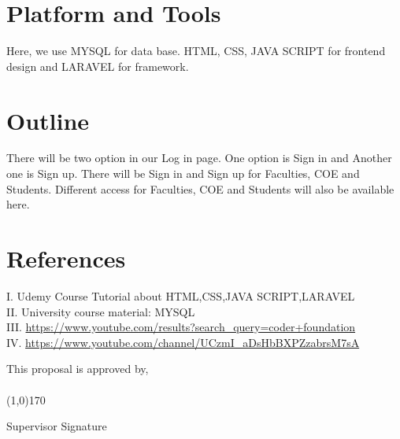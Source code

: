 \documentclass{article}
\begin{document}
\begin{titlepage}
\begin{figure}[h!]
\end{figure}

\vspace{10cm}

\section{Platform and Tools}\label{oject}

Here, we use MYSQL for data base. HTML, CSS, JAVA SCRIPT for frontend design and LARAVEL for framework.


\section{Outline}\label{oject}

There will be two option in our Log in page. One option is Sign in and Another one is Sign up. There will be Sign in and Sign up for Faculties, COE and Students. Different access for Faculties, COE and Students will also be available here.

\section{References}\label{oject}
I.	Udemy Course Tutorial about HTML,CSS,JAVA SCRIPT,LARAVEL \\
II.	University course material: MYSQL \\
III. \url{https://www.youtube.com/results?search_query=coder+foundation} \\
IV. \url{https://www.youtube.com/channel/UCzmI_aDsHbBXPZzabrsM7sA}

\vspace{10cm}
\label{oject}
This proposal is approved by,\\ \\


\hspace{300pt} \line(1,0){170}	

\hspace{325pt} Supervisor Signature\\



\end{titlepage}
\end{document}

